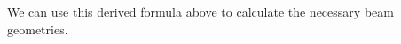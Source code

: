 %
%


%
%
%


%


We can use this derived formula above to calculate the necessary beam geometries. %


